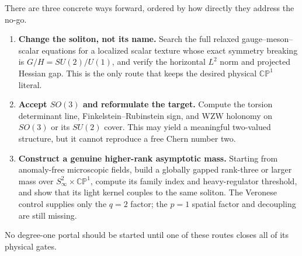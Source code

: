 \documentclass[11pt]{article}
\theoremstyle{definition}
\theoremstyle{remark}
\newcommand{\CP}{\mathbb {CP}}
\begin{document}
There are three concrete ways forward, ordered by how directly they address
the no-go.

\begin{enumerate}[label=\textbf{C\arabic*.}]
\item \textbf{Change the soliton, not its name.}  Search the full relaxed
  gauge--meson--scalar equations for a localized scalar texture whose exact
  symmetry breaking is \(G/H=SU(2)/U(1)\), and verify the horizontal
  \(L^2\) norm and projected Hessian gap.  This is the only route that keeps
  the desired physical \(\CP^1\) literal.
\item \textbf{Accept \(SO(3)\) and reformulate the target.}  Compute the
  torsion determinant line, Finkelstein--Rubinstein sign, and WZW holonomy on
  \(SO(3)\) or its \(SU(2)\) cover.  This may yield a meaningful two-valued
  structure, but it cannot reproduce a free Chern number two.
\item \textbf{Construct a genuine higher-rank asymptotic mass.}  Starting
  from anomaly-free microscopic fields, build a globally gapped rank-three
  or larger mass over \(S^2_\infty\times\CP^1\), compute its family index and
  heavy-regulator threshold, and show that its light kernel couples to the
  same soliton.  The Veronese control supplies only the \(q=2\) factor; the
  \(p=1\) spatial factor and decoupling are still missing.
\end{enumerate}

No degree-one portal should be started until one of these routes closes all
of its physical gates.



\end{document}
